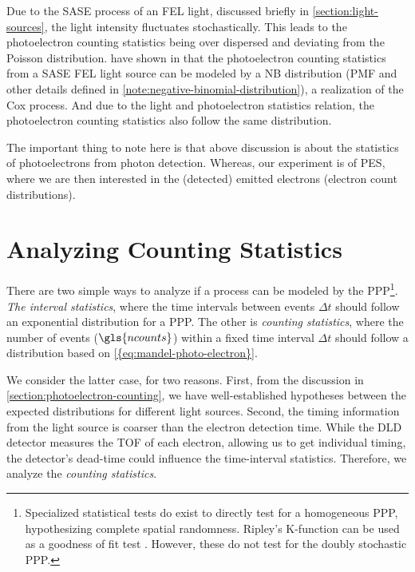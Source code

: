 Due to the \gls{SASE} process of an \gls{FEL} light, discussed briefly in \cref{section:light-sources}, the light intensity fluctuates stochastically. This leads to the photoelectron counting statistics being over dispersed and deviating from the Poisson distribution. \citeauthor{saldinStatisticalPropertiesRadiation1998} have shown in \cite{saldinStatisticalPropertiesRadiation1998} that the photoelectron counting statistics from a \gls{SASE} \gls{FEL} light source can be modeled by a \gls{NB} distribution (\gls{PMF} and other details defined in \cref{note:negative-binomial-distribution}), a realization of the Cox process. And due to the light and photoelectron statistics relation, the photoelectron counting statistics also follow the same distribution.

The important thing to note here is that above discussion is about the statistics of photoelectrons from photon detection. Whereas, our experiment is of \gls{PES}, where we are then interested in the (detected) emitted electrons (electron count distributions).

\section{Analyzing Counting Statistics}
There are two simple ways to analyze if a process can be modeled by the \gls{PPP}\footnote{Specialized statistical tests do exist to directly test for a homogeneous \gls{PPP}, hypothesizing complete spatial randomness. Ripley's K-function can be used as a goodness of fit test \cite[Section~2.6.4]{chiuStochasticGeometryIts2013}. However, these do not test for the doubly stochastic \gls{PPP}.}. \textit{The interval statistics}, where the time intervals between events $\Delta t$ should follow an exponential distribution for a \gls{PPP}. The other is \textit{counting statistics}, where the number of events ($\gls{ncounts}$) within a fixed time interval $\Delta t$ should follow a distribution based on \cref{{eq:mandel-photo-electron}}.

We consider the latter case, for two reasons. First, from the discussion in \cref{section:photoelectron-counting}, we have well-established hypotheses between the expected distributions for different light sources. Second, the timing information from the light source is coarser than the electron detection time. While the \gls{DLD} detector measures the \gls{TOF} of each electron, allowing us to get individual timing, the detector's dead-time could influence the time-interval statistics. Therefore, we analyze the \textit{counting statistics}.

